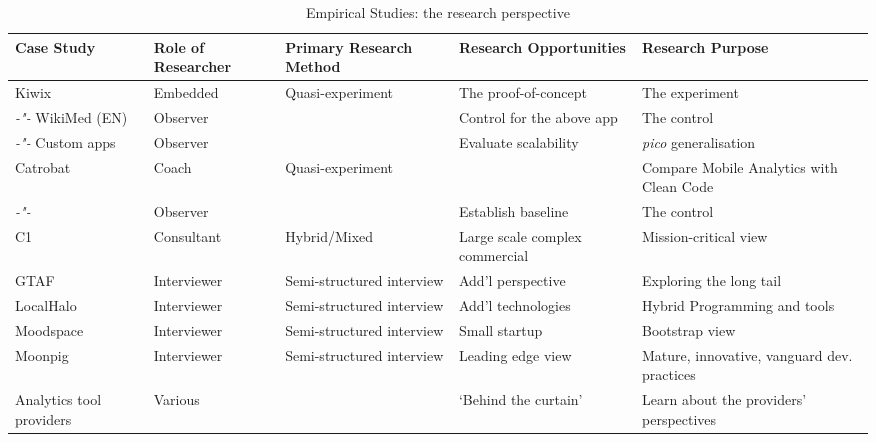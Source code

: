 \begin{landscape} %
\begin{table}
    \centering
    \tabcolsep=0.06cm
    \tiny
    \begin{tabular}{lllll}\toprule
    Case Study                 & Role of Researcher &  Primary Research Method   & Research Opportunities             & Research Purpose \\
    \midrule
    Kiwix                      & Embedded           & Quasi-experiment   &The proof-of-concept      & The experiment \\ 
     \textit{-"-} WikiMed (EN) & Observer           &                    &Control for the above app & The control  \\
    \textit{-"-} Custom apps   & Observer           &                    & Evaluate scalability     & \textit{pico} generalisation \\
    \midrule
    Catrobat                   & Coach              & Quasi-experiment   &                          & Compare Mobile Analytics with Clean Code \\
     \textit{-"-}              & Observer           &                    & Establish baseline       & The control  \\
     \midrule
    C1                         & Consultant         & Hybrid/Mixed & Large scale complex commercial & Mission-critical view \\
    GTAF                       & Interviewer        & Semi-structured interview & Add'l perspective & Exploring the long tail \\
    LocalHalo                  & Interviewer        & Semi-structured interview & Add'l technologies & Hybrid Programming and tools \\
    Moodspace                  & Interviewer        & Semi-structured interview & Small startup &Bootstrap view \\
    Moonpig                    & Interviewer        & Semi-structured interview & Leading edge view & Mature, innovative, vanguard dev. practices \\
    Analytics tool providers   & Various            & & `Behind the curtain' & Learn about the providers' perspectives \\
    \bottomrule
    \end{tabular}
    \caption{Empirical Studies: the research perspective}
    \label{tab:empirical-studies-research-perspective}
\end{table}
\end{landscape}


